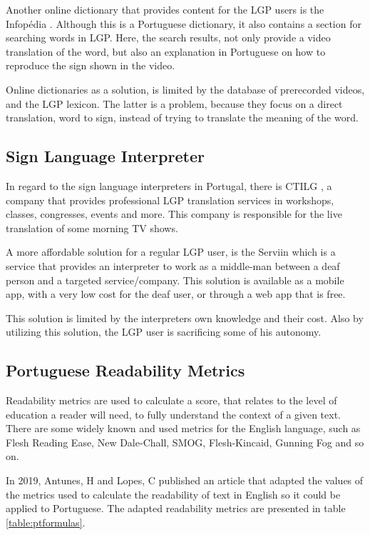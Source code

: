 \documentclass[runningheads]{llncs}
\begin{document}
Another online dictionary that provides content for the LGP users is the Infopédia \cite{infopedia_2020}.
Although this is a Portuguese dictionary, it also contains a section for searching words in LGP.
Here, the search results, not only provide a video translation of the word, but also an explanation in Portuguese on how to reproduce the sign shown in the video.

Online dictionaries as a solution, is limited by the database of prerecorded videos, and the LGP lexicon.
The latter is a problem, because they focus on a direct translation, word to sign, instead of trying to translate the meaning of the word.

\subsection{Sign Language Interpreter}

In regard to the sign language interpreters in Portugal, there is CTILG \cite{ctilg_2020}, a company that provides professional LGP translation services in workshops, classes, congresses, events and more.
This company is responsible for the live translation of some morning TV shows.

A more affordable solution for a regular LGP user, is the Serviin \cite{serviin_2020} which is a service that provides an interpreter to work as a middle-man between a deaf person and a targeted service/company.
This solution is available as a mobile app, with a very low cost for the deaf user, or through a  web app that is free.

This solution is limited by the interpreters own knowledge and their cost.
Also by utilizing this solution, the LGP user is sacrificing some of his autonomy.

\subsection{Portuguese Readability Metrics}

Readability metrics are used to calculate a score, that relates to the level of education a reader will need, to fully understand the context of a given text.
There are some widely known and used metrics for the English language, such as Flesh Reading Ease, New Dale-Chall, SMOG, Flesh-Kincaid, Gunning Fog and so on.

In 2019, Antunes, H and Lopes, C published an article \cite{ptread_2019} that adapted the values of the metrics used to calculate the readability of text in English so it could be applied to Portuguese.
The adapted readability metrics are presented in table \ref{table:ptformulas}.
\end{document}
